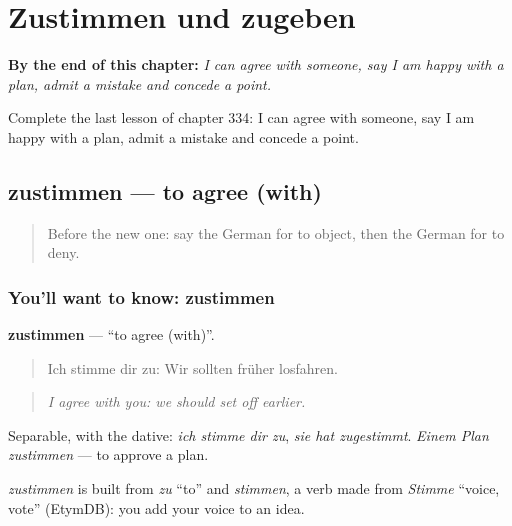 
\chapter{Zustimmen und zugeben}
\label{ch:ge-zustimmen-und-zugeben}

\begin{chapteropening}
\textbf{By the end of this chapter:} \emph{I can agree with someone, say I am happy with a plan, admit a mistake and concede a point.}

Complete the last lesson of chapter 334: I can agree with someone, say I am happy with a plan, admit a mistake and concede a point.
\end{chapteropening}

\section[zustimmen]{zustimmen — to agree (with)}

\label{lesson:GE-C334-zustimmen}



\begin{quote}
Before the new one: say the German for to object, then the German for to deny.
\end{quote}

\subsection*{You'll want to know: zustimmen}
\textbf{zustimmen} — \textquotedblleft{}to agree (with)\textquotedblright{}.

\begin{quote}
Ich stimme dir zu: Wir sollten früher losfahren.
\end{quote}

\begin{quote}
\emph{I agree with you: we should set off earlier.}
\end{quote}

Separable, with the dative: \emph{ich stimme dir zu}, \emph{sie hat zugestimmt}. \emph{Einem Plan zustimmen} — to approve a plan.

\begin{cousinweb}
\emph{zustimmen} is built from \emph{zu} \textquotedblleft{}to\textquotedblright{} and \emph{stimmen}, a verb made from \emph{Stimme} \textquotedblleft{}voice, vote\textquotedblright{} (EtymDB): you add your voice to an idea.
\end{cousinweb}

